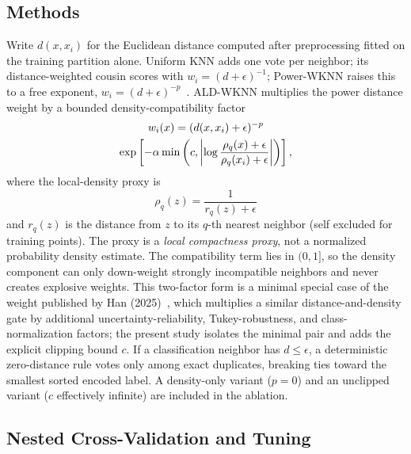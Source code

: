 \documentclass[conference]{IEEEtran}
\begin{document}
\subsection{Methods}

Write $d(x, x_i)$ for the Euclidean distance computed after preprocessing fitted on the training partition alone. Uniform KNN adds one vote per neighbor; its distance-weighted cousin scores with $w_i = (d + \epsilon)^{-1}$; Power-WKNN raises this to a free exponent, $w_i = (d + \epsilon)^{-p}$~\cite{dudani1976}. ALD-WKNN multiplies the power distance weight by a bounded density-compatibility factor
\begin{multline}\label{eq:aldw}
w_i(x) = (d(x,x_i)+\epsilon)^{-p} \notag\\
\exp\left[-\alpha \min\left(c, \left|\log\frac{\rho_q(x)+\epsilon}{\rho_q(x_i)+\epsilon}\right|\right)\right],
\end{multline}
where the local-density proxy is
\begin{equation}\label{eq:rho}
\rho_q(z) = \frac{1}{r_q(z)+\epsilon}
\end{equation}
and $r_q(z)$ is the distance from $z$ to its $q$-th nearest neighbor (self excluded for training points). The proxy is a \emph{local compactness proxy}, not a normalized probability density estimate. The compatibility term lies in $(0, 1]$, so the density component can only down-weight strongly incompatible neighbors and never creates explosive weights. This two-factor form is a minimal special case of the weight published by Han (2025)~\cite{dynamicdwknn2025}, which multiplies a similar distance-and-density gate by additional uncertainty-reliability, Tukey-robustness, and class-normalization factors; the present study isolates the minimal pair and adds the explicit clipping bound $c$. If a classification neighbor has $d \leq \epsilon$, a deterministic zero-distance rule votes only among exact duplicates, breaking ties toward the smallest sorted encoded label. A density-only variant ($p = 0$) and an unclipped variant ($c$ effectively infinite) are included in the ablation.

\subsection{Nested Cross-Validation and Tuning}
\end{document}
